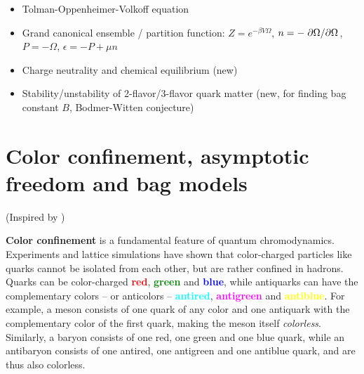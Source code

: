 \begin{itemize}
\item Tolman-Oppenheimer-Volkoff equation
\item Grand canonical ensemble / partition function: $Z = e^{-\beta V \Omega}$, $n = -\pdv{\Omega}/{\Omega}$, $P = -\Omega$, $\epsilon = -P + \mu n$
\item Charge neutrality and chemical equilibrium (new)
\item Stability/unstability of 2-flavor/3-flavor quark matter (new, for finding bag constant $B$, Bodmer-Witten conjecture)
\end{itemize}

\section{Color confinement, asymptotic freedom and bag models}

(Inspired by \cite{ref:quark_bag_model})


\begin{figure}
\centering
{}
\caption{\label{fig:lsm:confinement}%
}
\end{figure}

\textbf{Color confinement} is a fundamental feature of quantum chromodynamics.
Experiments and lattice simulations have shown that color-charged particles like quarks cannot be isolated from each other, but are rather confined in hadrons.
Quarks can be color-charged \textcolor{red}{\textbf{red}}, \textcolor{green}{\textbf{green}} and \textcolor{blue}{\textbf{blue}},
while antiquarks can have the complementary colors -- or anticolors -- \textcolor{cyan}{\textbf{antired}}, \textcolor{magenta}{\textbf{antigreen}} and \textcolor{yellow}{\textbf{antiblue}}.
For example, a meson consists of one quark of any color and one antiquark with the complementary color of the first quark, making the meson itself \emph{colorless}.
Similarly, a baryon consists of one red, one green and one blue quark,
while an antibaryon consists of one antired, one antigreen and one antiblue quark,
and are thus also colorless.

